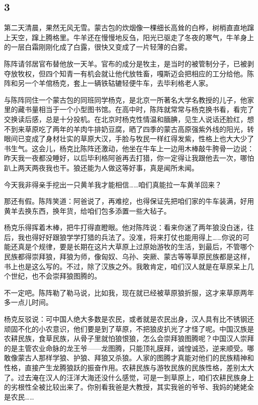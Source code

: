 \subsection*{3}


\par 第二天清晨，果然无风无雪。蒙古包的炊烟像一棵细长高耸的白桦，树梢直直地蹿上天空，蹿上腾格里。牛羊还在慢慢地反刍，阳光已驱走了冬夜的寒气，牛羊身上的一层白霜刚刚化成了白露，很快又变成了一片轻薄的白雾。
\par 陈阵请邻居官布替他放一天羊。官布的成分是牧主，是当时的被管制分子，已被剥夺放牧权，但四个知青一有机会就让他代放牲畜，嘎斯迈会把相应的工分给他。陈阵和另一个羊倌杨克，套上一辆铁轱辘轻便牛车，去毕利格老人家。
\par 与陈阵同住一个蒙古包的同班同学杨克，是北京一所著名大学名教授的儿子，他家里的藏书量相当于一个小型图书馆。在高中时，陈阵就常常与杨克换书看，看完了交换读后感，总是十分投机。在北京时杨克性情温和腼腆，见生人说话还脸红，想不到来草原吃了两年的羊肉牛排奶豆腐，晒了四季的蒙古高原强紫外线的阳光，转眼间已变成了身材壮实的草原大汉，手脸与牧民一样红得发紫，性格上也大大少了书生气。这会儿，杨克比陈阵还激动，他坐在牛车上一边用木棒敲牛胯骨一边说：昨天我一夜都没睡好，以后毕利格阿爸再去打猎，你一定得让我跟他去一次，哪怕趴上两天两夜我也干。狼还能为人做这等好事，真是闻所未闻。
\par 今天我非得亲手挖出一只黄羊我才能相信……咱们真能拉一车黄羊回来？
\par 那还有假。陈阵笑道：阿爸说了，再难挖，也得保证先把咱们家的牛车装满，好用黄羊去换东西，换年货，给咱们包多添置一些大毡子。
\par 杨克乐得挥着木棒，把牛打得直瞪眼。他对陈阵说：看来你迷了两年狼没白迷，往后，我也得好好跟狼学学打猎的兵法了。没准，将来打仗也能用得上……你说的可能还真是个规律，要是长期在这片大草原上过原始游牧的生活，到最后，不管哪个民族都得崇拜狼，拜狼为师，像匈奴、乌孙、突厥、蒙古等等草原民族都是这样，书上也是这么写的。不过，除了汉族之外。我敢肯定，咱们汉人就是在草原呆上几个世纪，也不会崇拜狼图腾的。
\par 不一定吧。陈阵勒了勒马说，比如我，现在就已经被草原狼折服，这才来草原两年多一点儿时间。
\par 杨克反驳说：可中国人绝大多数是农民，或者就是农民出身，汉人具有比不锈钢还顽固不化的小农意识，他们要是到了草原，不把狼皮扒光了才怪了呢。中国汉族是农耕民族，食草民族，从骨子里就怕狼恨狼，怎么会崇拜狼图腾呢？中国汉人崇拜的是主管农业命脉的龙王爷——龙图腾，只能顶礼膜拜，诚惶诚恐，逆来顺受。哪敢像蒙古人那样学狼、护狼、拜狼又杀狼。人家的图腾才真能对他们的民族精神和性格，直接产生龙腾狼跃的振奋作用。农耕民族与游牧民族的民族性格，差别太大了。过去淹在汉人的汪洋大海还没什么感觉，可是一到草原上，咱们农耕民族身上的劣根性全被比较出来了。你别看我爸是大教授，其实我爸的爷爷、我妈的姥姥全是农民……
